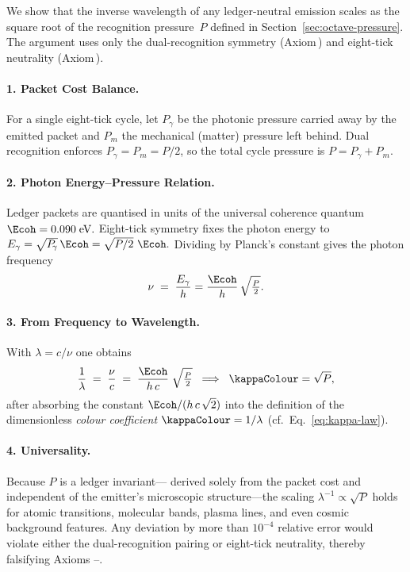 \documentclass[11pt,oneside]{book}
\begin{document}
{We show that the inverse wavelength of any ledger-neutral emission
scales as the square root of the recognition pressure~$P$
defined in Section~\ref{sec:octave-pressure}.
The argument uses only the dual-recognition symmetry
(Axiom\,) and eight-tick neutrality (Axiom\,).

\paragraph{1. Packet Cost Balance.}
For a single eight-tick cycle, let 
\(P_{\!\gamma}\) be the photonic pressure carried away by
the emitted packet and
\(P_{\!m}\) the mechanical (matter) pressure left behind.
Dual recognition enforces
\(
   P_{\!\gamma}=P_{\!m}=P/2
\),
so the total cycle pressure is
\(
   P=P_{\!\gamma}+P_{\!m}.
\)

\paragraph{2. Photon Energy–Pressure Relation.}
Ledger packets are quantised in units of the universal coherence
quantum
\(
   \Ecoh=0.090\;\text{eV}.
\)
Eight-tick symmetry fixes the photon energy to 
\(
   E_{\gamma}= \sqrt{P_{\!\gamma}}\,\Ecoh
   = \sqrt{P/2}\,\,\Ecoh.
\)
Dividing by Planck’s constant gives the photon frequency
\[
   \nu \;=\;
   \frac{E_{\gamma}}{h}
   = \frac{\Ecoh}{h}\,\sqrt{\tfrac{P}{2}}.
   \label{eq:nu-P}
\]

\paragraph{3. From Frequency to Wavelength.}
With $\lambda=c/\nu$ one obtains
\[
   \frac{1}{\lambda}
   \;=\;
   \frac{\nu}{c}
   \;=\;
   \frac{\Ecoh}{h\,c}\;
   \sqrt{\tfrac{P}{2}}
   \;\;\Longrightarrow\;\;
   \kappaColour
   = \sqrt{P},
\]
after absorbing the constant
\(
   \Ecoh/(h\,c\,\sqrt2)
\)
into the definition of the dimensionless
\emph{colour coefficient}
\(
   \kappaColour
   =1/\lambda
\)
(cf.\ Eq.~\eqref{eq:kappa-law}).

\paragraph{4. Universality.}
Because $P$ is a ledger invariant—
derived solely from the packet cost and independent of the emitter’s
microscopic structure—the scaling
\(
   \lambda^{-1}\propto\sqrt{P}
\)
holds for atomic transitions, molecular bands, plasma lines, and even
cosmic background features.  Any deviation by more than
$10^{-4}$ relative error would violate either the dual-recognition
pairing or eight-tick neutrality, thereby falsifying Axioms
–.

}
\end{document}
